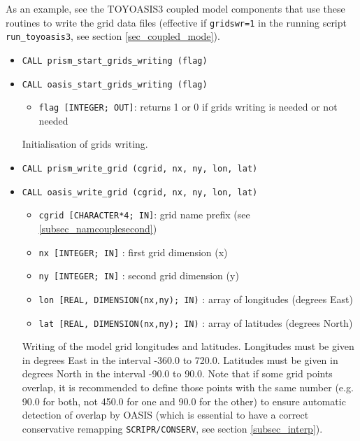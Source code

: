 As an example, see the TOYOASIS3 coupled model components that 
use these routines to write the grid data
files (effective if \texttt{gridswr=1} in the running script
\texttt{run\_toyoasis3},  
see section \ref{sec_coupled_mode}).


\begin{itemize}
  
\item {\tt CALL  prism\_start\_grids\_writing (flag)}
\item {\tt CALL  oasis\_start\_grids\_writing (flag)}
        
  \begin{itemize}
    \item {\tt flag [INTEGER; OUT]}:  returns 1 or 0 if grids writing is
    needed or not needed
  \end{itemize}
Initialisation of grids writing.

\item {\tt CALL prism\_write\_grid (cgrid, nx, ny, lon, lat)}
\item {\tt CALL oasis\_write\_grid (cgrid, nx, ny, lon, lat)}
        
 \begin{itemize}
    \item {\tt cgrid [CHARACTER*4; IN]}: grid name prefix (see
    \ref{subsec_namcouplesecond})
    \item {\tt nx [INTEGER; IN]} : first grid dimension (x)
    \item {\tt ny [INTEGER; IN]} : second grid dimension (y)
    \item {\tt lon [REAL, DIMENSION(nx,ny); IN)} : array of longitudes
      (degrees East) 
    \item {\tt lat [REAL, DIMENSION(nx,ny); IN)} : array of latitudes
    (degrees North)
 \end{itemize}

 Writing of the model grid longitudes and latitudes. Longitudes must
 be given in degrees East in the interval -360.0 to 720.0. Latitudes
 must be given in degrees North in the interval -90.0 to 90.0. Note
 that if some grid points overlap, it is recommended to define those
 points with the same number (e.g. 90.0 for both, not 450.0 for one
 and 90.0 for the other) to ensure automatic detection of overlap by OASIS
 (which is essential to have a correct conservative remapping
 \texttt{SCRIPR/CONSERV}, see section \ref{subsec_interp}). 



\end{itemize}
